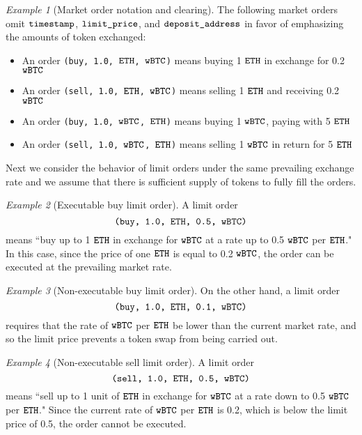 \documentclass[11pt, reqno]{amsart}
\theoremstyle{definition}
\theoremstyle{remark}
\newtheorem{exmp}{Example}[subsection]
\newcommand{\BTC}{\textnormal{\texttt{wBTC}}}
\newcommand{\ETH}{\textnormal{\texttt{ETH}}}
\newcommand{\timestamp}{\textnormal{\texttt{timestamp}}}
\newcommand{\limitprice}{\textnormal{\texttt{limit\_price}}}
\newcommand{\depositaddress}{\textnormal{\texttt{deposit\_address}}}
\newcommand{\buy}{\textnormal{\texttt{buy}}}
\newcommand{\sell}{\textnormal{\texttt{sell}}}
\begin{document}
\begin{exmp}[Market order notation and clearing]
The following market orders omit $\timestamp$, $\limitprice$, and
$\depositaddress$ in favor of emphasizing the amounts of token exchanged:
\begin{itemize}
    \item An order \texttt{(\buy, 1.0, $\ETH$, $\BTC$)} means buying 1
          $\ETH$ in exchange for 0.2 $\BTC$
    \item An order \texttt{(\sell, 1.0, $\ETH$, $\BTC$)} means selling 1 $\ETH$
          and receiving 0.2 $\BTC$
    \item An order \texttt{(\buy, 1.0, $\BTC$, $\ETH$)} means buying 1 $\BTC$,
          paying with 5 $\ETH$
    \item An order \texttt{(\sell, 1.0, $\BTC$, $\ETH$)} means selling 
          1 $\BTC$ in return for 5 $\ETH$
\end{itemize}
\end{exmp}
Next we consider the behavior of limit orders under the same prevailing exchange
rate and we assume that there is sufficient supply of tokens to fully fill the
orders.

\begin{exmp}[Executable buy limit order]
A limit order
\[
    \texttt{(\buy, 1.0, $\ETH$, 0.5, $\BTC$)}
\]
means
``buy up to 1 $\ETH$ in exchange for $\BTC$ at a rate up to 0.5 $\BTC$ per $\ETH$."
In this case, since the price of one $\ETH$ is equal to 0.2 $\BTC$, the order
can be executed at the prevailing market rate.
\end{exmp}

\begin{exmp}[Non-executable buy limit order]
On the other hand, a limit order
\[
    \texttt{(\buy, 1.0, $\ETH$, 0.1, $\BTC$)}
\]
requires that the rate of $\BTC$ per $\ETH$ be lower than the current market
rate, and so the limit price prevents a token swap from being carried out.
\end{exmp}

\begin{exmp}[Non-executable sell limit order]
A limit order
\[
    \texttt{(\sell, 1.0, $\ETH$, 0.5, $\BTC$)}
\]
means
``sell up to 1 unit of $\ETH$ in exchange for $\BTC$ at a rate down to 0.5 $\BTC$ per $\ETH$."
Since the current rate of $\BTC$ per $\ETH$ is 0.2, which is below the limit
price of 0.5, the order cannot be executed.
\end{exmp}


\end{document}
